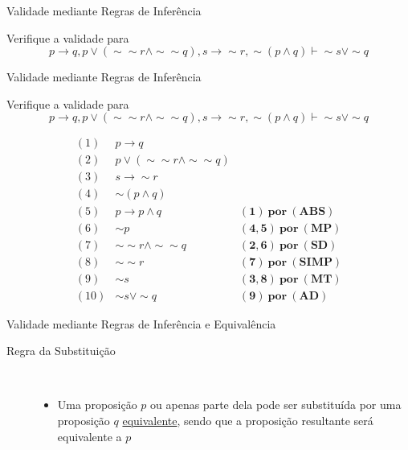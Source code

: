 \begin{frame}[t]{Validade mediante Regras de Inferência}

	Verifique a validade para $$p \rightarrow q, p \vee (\sim\sim r \wedge\sim\sim q), s \rightarrow\sim r, \sim (p \wedge q) \vdash \sim s \vee\sim q$$

\end{frame}


\begin{frame}[t]{Validade mediante Regras de Inferência}

	Verifique a validade para $$p \rightarrow q, p \vee (\sim\sim r \wedge\sim\sim q), s \rightarrow\sim r, \sim (p \wedge q) \vdash \sim s \vee\sim q$$
	
	\vskip 0.5cm
	
	$$\begin{array}{lll}
	(1) & p \rightarrow q  & \\
	(2) & p \vee (\sim\sim r \wedge\sim\sim q) & \\
	(3) & s \rightarrow\sim r & \\
	(4) & \sim (p \wedge q) & \\
	\hline
	(5) & p \rightarrow p \wedge q & \mathbf{(1)~por~(ABS)} \\
	(6) & \sim p & \mathbf{(4,5)~por~(MP)} \\
	(7) & \sim\sim r \wedge\sim\sim q & \mathbf{(2,6)~por~(SD)} \\
	(8) & \sim\sim r & \mathbf{(7)~por~(SIMP)} \\
	(9) & \sim s & \mathbf{(3,8)~por~(MT)} \\
	(10) & \sim s \vee\sim q & \mathbf{(9)~por~(AD)}
	\end{array}$$	
\end{frame}


\begin{frame}[t]{Validade mediante Regras de Inferência e Equivalência}	
	\begin{description}
	\item[Regra da Substituição] ~~
	\begin{itemize}
	\item Uma proposição $p$ ou apenas parte dela pode ser substituída por uma proposição $q$ \underline{equivalente}, sendo que a proposição resultante será equivalente a $p$
	\end{itemize}
	\end{description}
\end{frame}


